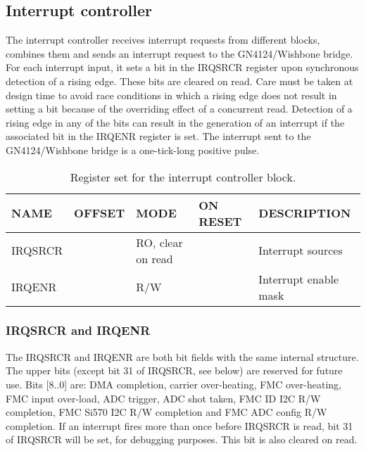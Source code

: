 \documentclass{article}
\begin{document}
\subsection{Interrupt controller}
The interrupt controller receives interrupt requests from different blocks, combines them and sends an interrupt request to the GN4124/Wishbone bridge. For each interrupt input, it sets a bit in the IRQSRCR register upon synchronous detection of a rising edge. These bits are cleared on read. Care must be taken at design time to avoid race conditions in which a rising edge does not result in setting a bit because of the overriding effect of a concurrent read. Detection of a rising edge in any of the bits can result in the generation of an interrupt if the associated bit in the IRQENR register is set. The interrupt sent to the GN4124/Wishbone bridge is a one-tick-long positive pulse.

\begin{table}[htbp]
  \centering
  \begin{tabularx}{\textwidth}{|l|r|X|l|l|}
    \hline
    \textbf{NAME} & \textbf{OFFSET} & \textbf{MODE} & \textbf{ON RESET} & \textbf{DESCRIPTION} \\
    \hline
    \hline
    IRQSRCR & & RO, clear on read & & Interrupt sources\\
    \hline
    IRQENR & & R/W & & Interrupt enable mask\\
    \hline
  \end{tabularx}
  \caption{Register set for the interrupt controller block.}
  \label{tab:irq_control}
\end{table}

\subsubsection{IRQSRCR and IRQENR}
The IRQSRCR and IRQENR are both bit fields with the same internal structure. The upper bits (except bit 31 of IRQSRCR, see below) are reserved for future use. Bits [8..0] are: DMA completion, carrier over-heating, FMC over-heating, FMC input over-load, ADC trigger, ADC shot taken, FMC ID I2C R/W completion, FMC Si570 I2C R/W completion and FMC ADC config R/W completion. If an interrupt fires more than once before IRQSRCR is read, bit 31 of IRQSRCR will be set, for debugging purposes. This bit is also cleared on read.   
\end{document}
